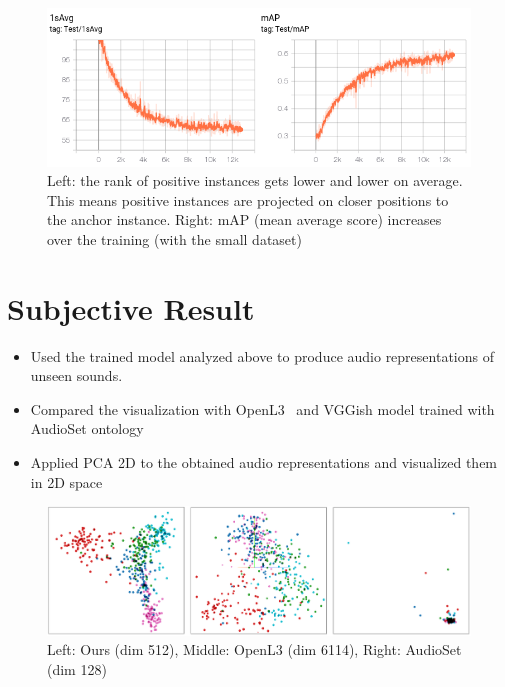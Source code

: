 \begin{figure}[htb]
	\centering
	\includegraphics[width=15cm]{Figures/good_semihard_result.png}
	\caption{Left: the rank of positive instances gets lower and lower on average. This means positive instances are projected on closer positions to the anchor instance. Right: mAP (mean average score) increases over the training (with the small dataset)}
	\label{good_distance}
\end{figure}

\section{Subjective Result}

\begin{itemize}
    \item Used the trained model analyzed above to produce audio representations of unseen sounds.
    \item Compared the visualization with OpenL3~\cite{cramer2019} and VGGish model trained with AudioSet ontology~\cite{jort2017}
    \item Applied PCA 2D to the obtained audio representations and visualized them in 2D space
\end{itemize}

\begin{figure}[htb]
	\centering
	\includegraphics[width=15cm]{Figures/emb_examples.png}
	\caption{Left: Ours (dim 512), Middle: OpenL3 (dim 6114), Right: AudioSet (dim 128) }
	\label{emb_examples}
\end{figure}


\newpage


